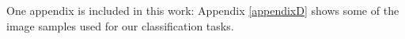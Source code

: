 One appendix is included in this work: Appendix \ref{appendixD} shows some of the image samples used for our classification tasks.










 

